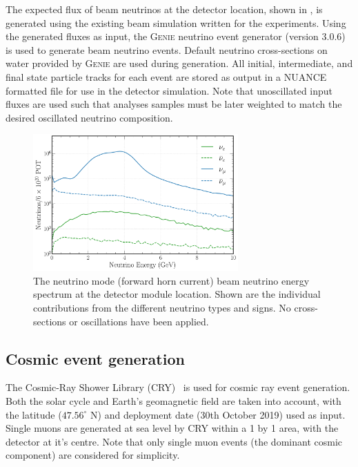 The expected flux of beam neutrinos at the \chipsfive detector location, shown in
, is generated using the existing beam simulation written for the \numi
experiments. Using the generated fluxes as input, the \textsc{Genie} neutrino event generator
(version 3.0.6)~\cite{andreopoulos2009, andreopoulos2015} is used to generate beam neutrino
events. Default neutrino cross-sections on water provided by \textsc{Genie} are used during
generation. All initial, intermediate, and final state particle tracks for each event are stored
as output in a NUANCE formatted file for use in the detector simulation. Note that unoscillated
input fluxes are used such that analyses samples must be later weighted to match the desired
oscillated neutrino composition.

\begin{figure} %
    \includegraphics[width=0.7\textwidth]{diagrams/4-chips/flux.pdf}
    \caption[\numi neutrino flux at the \chipsfive detector location]
    {The neutrino mode (forward horn current) \numi beam neutrino energy spectrum at the
        \chipsfive detector module location. Shown are the individual contributions from the
        different neutrino types and signs. No cross-sections or oscillations have been applied.}
    \label{fig:flux}
\end{figure}

\subsection{Cosmic event generation} %
\label{sec:chips_monte_carlo_cosmic} %

The Cosmic-Ray Shower Library (CRY)~\cite{hagmann2012_1, hagmann2012_2} is used for cosmic ray
event generation. Both the solar cycle and Earth's geomagnetic field are taken into account, with
the \mbox{\chipsfive} latitude ($47.56^{\circ}$ N) and deployment date (30th October 2019) used as
input. Single muons are generated at sea level by CRY within a \SI{1}{} by
\SI{1}{} area, with the detector at it's centre. Note that only single muon events (the
dominant cosmic component) are considered for simplicity.

